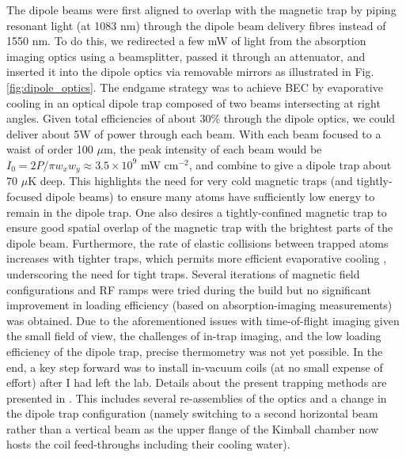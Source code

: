 	The dipole beams were first aligned to overlap with the magnetic trap by piping resonant light (at 1083 nm) through the dipole beam delivery fibres instead of 1550 nm.
	To do this, we redirected a few mW of light from the absorption imaging optics using a beamsplitter, passed it through an attenuator, and inserted it into the dipole optics via removable mirrors as illustrated in Fig.	\ref{fig:dipole_optics}.
	The endgame strategy was to achieve BEC by evaporative cooling in an optical dipole trap composed of two beams intersecting at right angles.
	Given total efficiencies of about 30\% through the dipole optics, we could deliver about 5W of power through each beam.
	With each beam focused to a waist of order 100 $\mu$m, the peak intensity of each beam would be $I_0 = 2P/\pi w_x w_y \approx 3.5\times10^9$ mW cm$^{-2}$, and combine to give a dipole trap about 70 $\mu$K deep.
	This highlights the need for very cold magnetic traps (and tightly-focused dipole beams) to ensure many atoms have sufficiently low energy to remain in the dipole trap.
	One also desires a tightly-confined magnetic trap to ensure good spatial overlap of the magnetic trap with the brightest parts of the dipole beam.
	Furthermore, the rate of elastic collisions between trapped atoms increases with tighter traps, which permits more efficient evaporative cooling \cite{Ketterle96}, underscoring the need for tight traps.
	Several iterations of magnetic field configurations and RF ramps were tried during the build but no significant improvement in loading efficiency (based on absorption-imaging measurements) was obtained.
	Due to the aforementioned issues with time-of-flight imaging given the small field of view, the challenges of in-trap imaging, and the low loading efficiency of the dipole trap, precise thermometry was not yet possible.  
	In the end, a key step forward was to install in-vacuum coils (at no small expense of effort) after I had left the lab.
	Details about the present trapping methods are presented in \cite{Abbas21}.
	This includes several re-assemblies of the optics and a change in the dipole trap configuration (namely switching to a second horizontal beam rather than a vertical beam as the upper flange of the Kimball chamber now hosts the coil feed-throughs including their cooling water).
	


